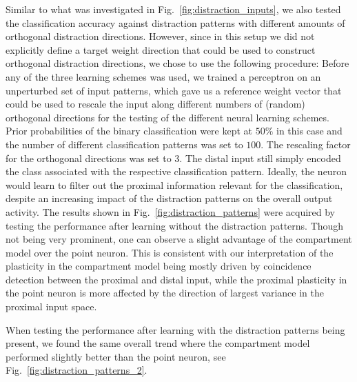 \documentclass[10pt,a4paper]{article}
\begin{document}
Similar to what was investigated in Fig.~\ref{fig:distraction_inputs}, we also tested the classification accuracy against distraction patterns with different amounts of orthogonal distraction directions. However, since in this setup we did not explicitly define a target weight direction that could be used to construct orthogonal distraction directions, we chose to use the following procedure: Before any of the three learning schemes was used, we trained a perceptron on an unperturbed set of input patterns, which gave us a reference weight vector that could be used to rescale the input along different numbers of (random) orthogonal directions for the testing of the different neural learning schemes. Prior probabilities of the binary classification were kept at $50\%$ in this case and the number of different classification patterns was set to $100$. The rescaling factor for the orthogonal directions was set to $3$. The distal input still simply encoded the class associated with the respective classification pattern. Ideally, the neuron would learn to filter out the proximal information relevant for the classification, despite an increasing impact of the distraction patterns on the overall output activity. The results shown in Fig.~\ref{fig:distraction_patterns} were acquired by testing the performance after learning without the distraction patterns. Though not being very prominent, one can observe a slight advantage of the compartment model over the point neuron. This is consistent with our interpretation of the plasticity in the compartment model being mostly driven by coincidence detection between the proximal and distal input, while the proximal plasticity in the point neuron is more affected by the direction of largest variance in the proximal input space.

When testing the performance after learning with the distraction patterns being present, we found the same overall trend where the compartment model performed slightly better than the point neuron, see Fig.~\ref{fig:distraction_patterns_2}.
\end{document}
